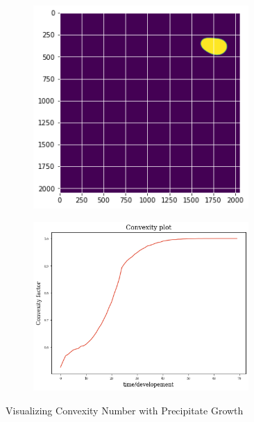 \documentclass[12pt, a4paper]{report}
\begin{document}
\begin{figure}[H]
\begin{subfigure}{.32\textwidth}
  \label{img:microstrImg}
\end{subfigure}
\begin{subfigure}{.32\textwidth}
  \centering
  \includegraphics[width=0.9\textwidth]{Pictures/MSFeatures/ConvexMSEnd.png}
  \label{img:microstrImg}
\end{subfigure}
\begin{subfigure}{.5\textwidth}
  \centering
  \includegraphics[width=0.9\textwidth]{Pictures/MSFeatures/IsoGrainConvexity.png}
  \label{img:microstrImg}
\end{subfigure}
\caption{Visualizing Convexity Number with Precipitate Growth}
\label{fig:test}
\end{figure}
\end{document}
